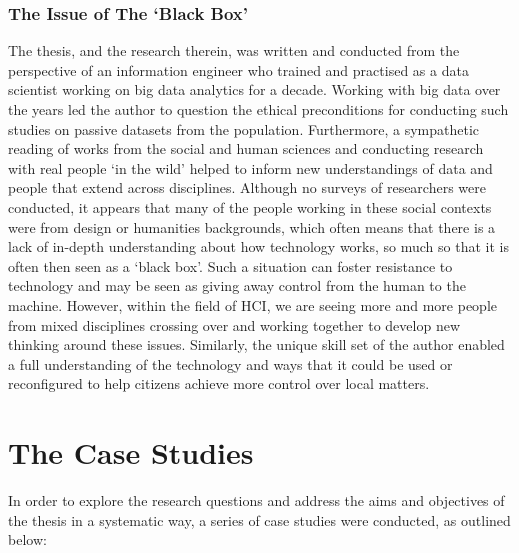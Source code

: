 \begin{introduction}
\subsubsection{The Issue of The `Black Box'}
The thesis, and the research therein, was written and conducted from the perspective of an information engineer who trained and practised as a data scientist working on big data analytics for a decade. Working with big data over the years led the author to question the ethical preconditions for conducting such studies on passive datasets from the population. Furthermore, a sympathetic reading of works from the social and human sciences and conducting research with real people `in the wild' helped to inform new understandings of data and people that extend across disciplines. Although no surveys of researchers were conducted, it appears that many of the people working in these social contexts were from design or humanities backgrounds, which often means that there is a lack of in-depth understanding about how technology works, so much so that it is often then seen as a `black box'. Such a situation can foster resistance to technology and may be seen as giving away control from the human to the machine. However, within the field of HCI, we are seeing more and more people from mixed disciplines crossing over and working together to develop new thinking around these issues. Similarly, the unique skill set of the author enabled a full understanding of the technology and ways that it could be used or reconfigured to help citizens achieve more control over local matters.
\clearpage

\section{The Case Studies}
In order to explore the research questions and address the aims and objectives of the thesis in a systematic way, a series of case studies were conducted, as outlined below:
\newline


\end{introduction}
